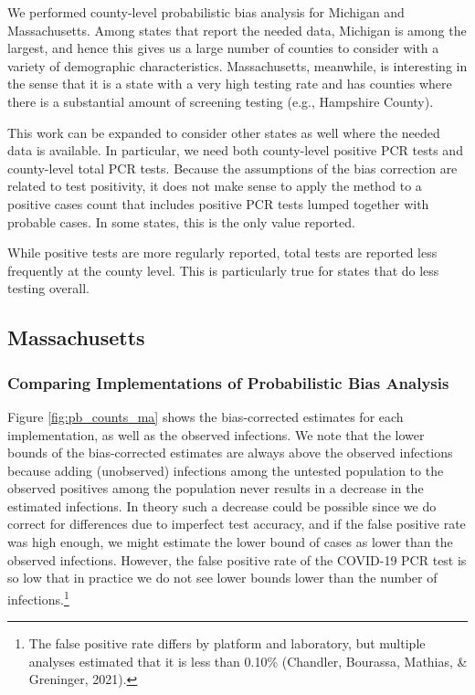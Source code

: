 \documentclass[12pt,twoside]{smiththesis}
\begin{document}
We performed county-level probabilistic bias analysis for Michigan and Massachusetts. Among states that report the needed data, Michigan is among the largest, and hence this gives us a large number of counties to consider with a variety of demographic characteristics. Massachusetts, meanwhile, is interesting in the sense that it is a state with a very high testing rate and has counties where there is a substantial amount of screening testing (e.g., Hampshire County).

This work can be expanded to consider other states as well where the needed data is available. In particular, we need both county-level positive PCR tests and county-level total PCR tests. Because the assumptions of the bias correction are related to test positivity, it does not make sense to apply the method to a positive cases count that includes positive PCR tests lumped together with probable cases. In some states, this is the only value reported.

While positive tests are more regularly reported, total tests are reported less frequently at the county level. This is particularly true for states that do less testing overall.

\hypertarget{massachusetts}{%
\subsection{Massachusetts}\label{massachusetts}}

\hypertarget{comparing-implementations-of-probabilistic-bias-analysis}{%
\subsubsection{Comparing Implementations of Probabilistic Bias Analysis}\label{comparing-implementations-of-probabilistic-bias-analysis}}

Figure \ref{fig:pb_counts_ma} shows the bias-corrected estimates for each implementation, as well as the observed infections. We note that the lower bounds of the bias-corrected estimates are always above the observed infections because adding (unobserved) infections among the untested population to the observed positives among the population never results in a decrease in the estimated infections. In theory such a decrease could be possible since we do correct for differences due to imperfect test accuracy, and if the false positive rate was high enough, we might estimate the lower bound of cases as lower than the observed infections. However, the false positive rate of the COVID-19 PCR test is so low that in practice we do not see lower bounds lower than the number of infections.\footnote{The false positive rate differs by platform and laboratory, but multiple analyses estimated that it is less than 0.10\% (Chandler, Bourassa, Mathias, \& Greninger, 2021).}
\end{document}
